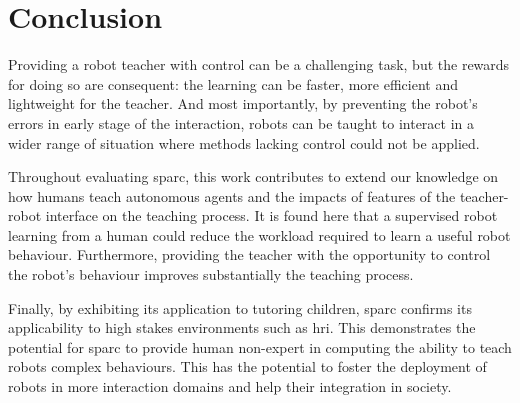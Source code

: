 \section{Conclusion}\label{sec:conc_conc}

Providing a robot teacher with control can be a challenging task, but the rewards for doing so are consequent: the learning can be faster, more efficient and lightweight for the teacher. And most importantly, by preventing the robot's errors in early stage of the interaction, robots can be taught to interact in a wider range of situation where methods lacking control could not be applied.

Throughout evaluating \gls{sparc}, this work contributes to extend our knowledge on how humans teach autonomous agents and the impacts of features of the teacher-robot interface on the teaching process. It is found here that a supervised robot learning from a human could reduce the workload required to learn a useful robot behaviour. Furthermore, providing the teacher with the opportunity to control the robot's behaviour improves substantially the teaching process.

Finally, by exhibiting its application to tutoring children, \gls{sparc} confirms its applicability to high stakes environments such as \gls{hri}. This demonstrates the potential for \gls{sparc} to provide human non-expert in computing the ability to teach robots complex behaviours. This has the potential to foster the deployment of robots in more interaction domains and help their integration in society.
